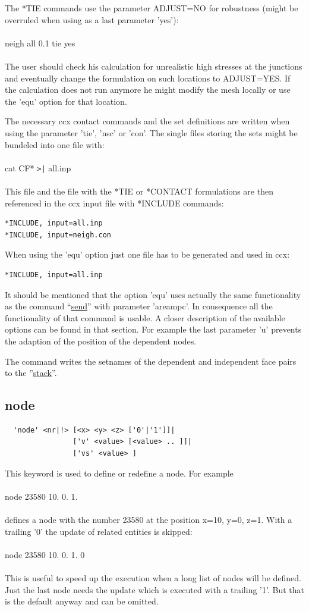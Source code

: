 \documentclass{article}
\providecommand{\htmlref}[2]{\hyperref[#2]{#1}}
\begin{document}
The *TIE commands use the parameter ADJUST=NO for robustness (might be overruled when using as a last parameter 'yes'):\\\\ neigh all 0.1 tie yes\\\\The user should check his calculation for unrealistic high stresses at the junctions and eventually change the formulation on such locations to ADJUST=YES. If the calculation does not run anymore he might modify the mesh locally or use the 'equ' option for that location.

The necessary ccx contact commands and the set definitions are written when using the parameter 'tie', 'nsc' or 'con'. The single files storing the sets might be bundeled into one file with:\\\\cat CF* \verb_>|_ all.inp\\\\This file and the file with the *TIE or *CONTACT formulations are then referenced in the ccx input file with *INCLUDE commands:
\begin{verbatim}
*INCLUDE, input=all.inp
*INCLUDE, input=neigh.con
\end{verbatim}
When using the 'equ' option just one file has to be generated and used in ccx:
\begin{verbatim}
*INCLUDE, input=all.inp
\end{verbatim}

It should be mentioned that the option 'equ' uses actually the same functionality as the command ``\htmlref{send}{send}'' with parameter 'areampc'. In consequence all the functionality of that command is usable. A closer description of the available options can be found in that section. For example the last parameter 'u' prevents the adaption of the position of the dependent nodes.

The command writes the setnames of the dependent and independent face pairs to the ''\htmlref{stack}{stack}''.

\subsection{\label{node}node}
\begin{verbatim}
  'node' <nr|!> [<x> <y> <z> ['0'|'1']]|
                ['v' <value> [<value> .. ]]|
                ['vs' <value> ]
\end{verbatim}
This keyword is used to define or redefine a node. For example\\\\node 23580 10. 0. 1.\\\\defines a node with the number 23580 at the position x=10, y=0, z=1. With a trailing '0' the update of related entities is skipped:\\\\node 23580 10. 0. 1. 0\\\\This is useful to speed up the execution when a long list of nodes will be defined. Just the last node needs the update which is executed with a trailing '1'. But that is the default anyway and can be omitted.
\end{document}
